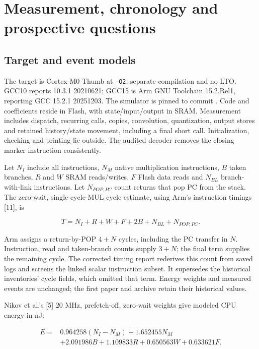 \documentclass[conference]{IEEEtran}
\begin{document}
\section{Measurement, chronology and prospective questions}\label{measurement-chronology-and-prospective-questions}

\subsection{Target and event models}\label{target-and-event-models}

The target is Cortex-M0 Thumb at \texttt{-O2}, separate compilation and
no LTO. GCC10 reports 10.3.1 20210621; GCC15 is Arm GNU Toolchain
15.2.Rel1, reporting GCC 15.2.1 20251203. The simulator is pinned to
commit \texttt{}.
Code and coefficients reside in Flash, with state/input/output in SRAM.
Measurement includes dispatch, recurring calls, copies, convolution,
quantization, output stores and retained history/state movement,
including a final short call. Initialization, checking and printing lie
outside. The audited decoder removes the closing marker instruction
consistently.

Let \(N_I\) include all instructions, \(N_M\) native multiplication
instructions, \(B\) taken branches, \(R\) and \(W\) SRAM reads/writes,
\(F\) Flash data reads and \(N_{BL}\) branch-with-link instructions. Let
\(N_{POP,PC}\) count returns that pop PC from the stack. The zero-wait,
single-cycle-MUL cycle estimate, using Arm's instruction timings
{[}11{]}, is

\[T=N_I+R+W+F+2B+N_{BL}+N_{POP,PC}.\]

Arm assigns a return-by-POP \(4+N\) cycles, including the PC transfer in
\(N\). Instruction, read and taken-branch counts supply \(3+N\); the
final term supplies the remaining cycle. The corrected timing report
rederives this count from saved logs and screens the linked scalar
instruction subset. It supersedes the historical inventories' cycle
fields, which omitted that term. Energy weights and measured events are
unchanged; the first paper and archive retain their historical values.

Nikov et al.'s {[}5{]} 20 MHz, prefetch-off, zero-wait weights give
modeled CPU energy in nJ:

\[
\begin{aligned}
E={}&0.964258(N_I-N_M)+1.652455N_M\\
 &+2.091986B+1.109833R+0.650563W+0.633621F.
\end{aligned}
\]
\end{document}

